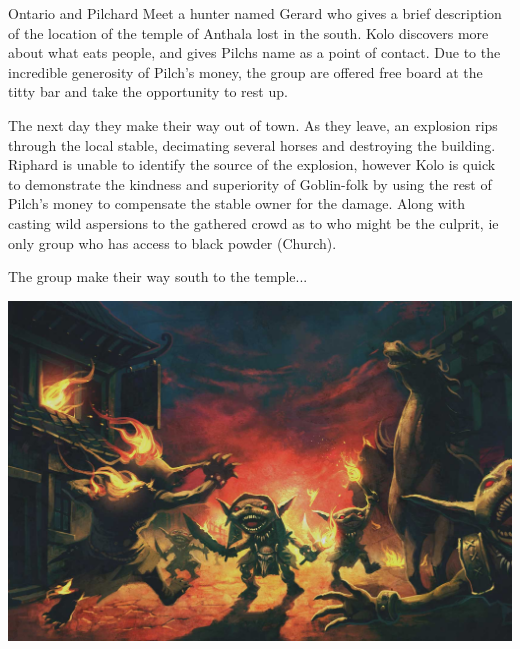 \begin{multicols}{2}
Ontario and Pilchard Meet a hunter named Gerard who gives a brief description of the location of the temple of Anthala lost in the south. Kolo discovers more about what eats people, and gives Pilchs name as a point of contact. Due to the incredible generosity of Pilch’s money, the group are offered free board at the titty bar and take the opportunity to rest up.\medskip

The next day they make their way out of town. As they leave, an explosion rips through the local stable, decimating several horses and destroying the building. Riphard is unable to identify the source of the explosion, however Kolo is quick to demonstrate the kindness and superiority of Goblin-folk by using the rest of Pilch’s money to compensate the stable owner for the damage. Along with casting wild aspersions to the gathered crowd as to who might be the culprit, ie only group who has access to black powder (Church).\medskip

The group make their way south to the temple...\medskip



\end{multicols}

\vspace*{5mm}

\begin{center}
\includegraphics[width=\textwidth]{./content/img/goblin9.jpg}
\begin{figure}[h]
\end{figure}
\end{center}

\clearpage